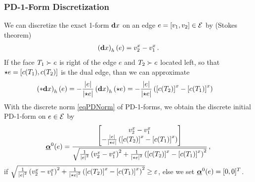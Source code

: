 \documentclass[a4paper,11pt]{scrartcl}
\begin{document}
\subsubsection{PD-1-Form Discretization}
We can discretize the exact 1-form \( \mathbf{d} x \) on an edge \( e=\left[ v_{1} , v_{2} \right]\in\mathcal{E} \) by (Stokes theorem)
\begin{align}
  \left( \mathbf{d} x \right)_{h}(e) = v_{2}^{x} - v_{1}^{x} \,\text{.} 
\end{align}
If the face \( T_{1}\succ e \) is right of the edge \( e \) and \( T_{2}\succ e \) located left, 
so that \( \star e = [c(T_{1}),c(T_{2})] \) is the dual edge, than we can approximate
\begin{align}
  \left( *\mathbf{d} x \right)_{h}(e) &= -\frac{\left| e \right|}{\left| \star e \right|} \left( \mathbf{d} x \right)_{h}(\star e)
                                 = -\frac{\left| e \right|}{\left| \star e \right|} \left( \left[c(T_{2})  \right]^{x} - \left[c(T_{1})  \right]^{x} \right)
\end{align}
With the discrete norm \eqref{eqPDNorm} of PD-1-forms, we obtain the discrete initial PD-1-form on \( e \in \mathcal{E} \) by
\begin{align}
  \underline{\bm{\alpha}}^{0}(e) = \frac{
                   \begin{bmatrix}
                      v_{2}^{x} - v_{1}^{x}\\
        -\frac{\left| e \right|}{\left| \star e \right|} \left( \left[c(T_{2})  \right]^{x} - \left[c(T_{1})  \right]^{x} \right)
                   \end{bmatrix}
                }{\sqrt{\frac{1}{\left| e \right|^{2}}\left(v_{2}^{x} - v_{1}^{x}  \right)^{2}
                                 +\frac{1}{\left| \star e \right|^{2}}\left( \left[c(T_{2})  \right]^{x} - \left[c(T_{1})
                                 \right]^{x}\right)^{2} }} \,\text{,}
\end{align}
if \( \sqrt{\frac{1}{\left| e \right|^{2}}\left(v_{2}^{x} - v_{1}^{x}  \right)^{2}
                                 +\frac{1}{\left| \star e \right|^{2}}\left( \left[c(T_{2})  \right]^{x} - \left[c(T_{1})
                                 \right]^{x}\right)^{2} } \ge \varepsilon \),
else we set \( \underline{\bm{\alpha}}^{0}(e) = [0,0]^{T} \).
\end{document}
